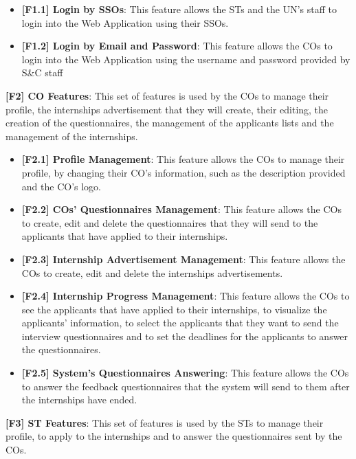 \begin{itemize}
    \item \textbf{[F1.1] Login by SSOs}: This feature allows the STs and the UN's staff to login into the Web Application
    using their SSOs.
    \item \textbf{[F1.2] Login by Email and Password}: This feature allows the COs to login into the Web Application
    using the username and password provided by S\&C staff
\end{itemize}

\par \textbf{[F2] CO Features}: This set of features is used by the COs to manage their profile, the internships
advertisement that they will create, their editing, the creation of the questionnaires, the management of the applicants
lists and the management of the internships.

\begin{itemize}
    \item \textbf{[F2.1] Profile Management}: This feature allows the COs to manage their profile, by changing their
    CO's information, such as the description provided and the CO's logo.
    \item \textbf{[F2.2] COs' Questionnaires Management}: This feature allows the COs to create, edit and delete the 
    questionnaires that they will send to the applicants that have applied to their internships.
    \item \textbf{[F2.3] Internship Advertisement Management}: This feature allows the COs to create, edit and delete
    the internships advertisements.
    \item \textbf{[F2.4] Internship Progress Management}: This feature allows the COs to see the applicants that have
    applied to their internships, to visualize the applicants' information, to select the applicants that they want to
    send the interview questionnaires and to set the deadlines for the applicants to answer the questionnaires.
    \item \textbf{[F2.5] System's Questionnaires Answering}: This feature allows the COs to answer the feedback 
    questionnaires that the system will send to them after the internships have ended.
\end{itemize}

\par \textbf{[F3] ST Features}: This set of features is used by the STs to manage their profile, to apply to the 
internships and to answer the questionnaires sent by the COs.

